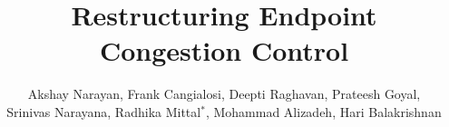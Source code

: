 \documentclass[newfonts=false,format=sigconf,10pt,letterpaper,natbib=false]{acmart}
\begin{document}
\title{Restructuring Endpoint Congestion Control}
\author{
Akshay Narayan,
Frank Cangialosi,
Deepti Raghavan,
Prateesh Goyal,\\
Srinivas Narayana,
Radhika Mittal$^{*}$,
Mohammad Alizadeh,
Hari Balakrishnan
}


\maketitle












\end{document}
